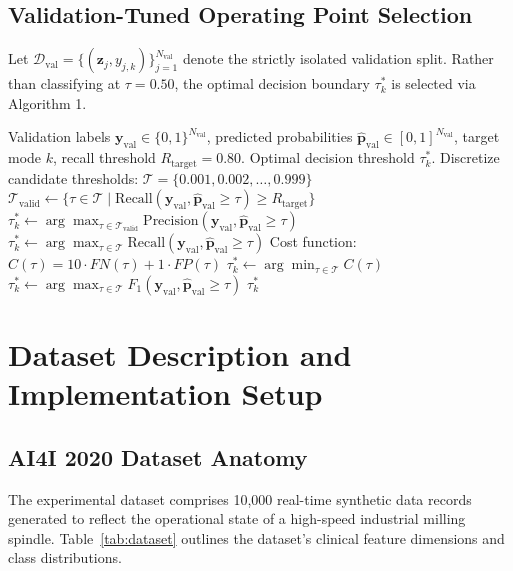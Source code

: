 \documentclass[conference]{IEEEtran}
\begin{document}
\subsection{Validation-Tuned Operating Point Selection}
Let $\mathcal{D}_{\text{val}} = \{(\mathbf{z}_j, y_{j,k})\}_{j=1}^{N_{\text{val}}}$ denote the strictly isolated validation split. Rather than classifying at $\tau = 0.50$, the optimal decision boundary $\tau_k^*$ is selected via Algorithm 1.

\begin{algorithm}[h]
\caption{Aegis Validation-Tuned Operating Point Selection}
\begin{algorithmic}[1]
\REQUIRE Validation labels $\mathbf{y}_{\text{val}} \in \{0, 1\}^{N_{\text{val}}}$, predicted probabilities $\hat{\mathbf{p}}_{\text{val}} \in [0, 1]^{N_{\text{val}}}$, target mode $k$, recall threshold $R_{\text{target}} = 0.80$.
\ENSURE Optimal decision threshold $\tau_k^*$.
\STATE Discretize candidate thresholds: $\mathcal{T} = \{0.001, 0.002, \dots, 0.999\}$
    \STATE $\mathcal{T}_{\text{valid}} \leftarrow \{\tau \in \mathcal{T} \mid \text{Recall}(\mathbf{y}_{\text{val}}, \hat{\mathbf{p}}_{\text{val}} \ge \tau) \ge R_{\text{target}}\}$
        \STATE $\tau_k^* \leftarrow \arg\max_{\tau \in \mathcal{T}_{\text{valid}}} \text{Precision}(\mathbf{y}_{\text{val}}, \hat{\mathbf{p}}_{\text{val}} \ge \tau)$
    \ELSE
        \STATE $\tau_k^* \leftarrow \arg\max_{\tau \in \mathcal{T}} \text{Recall}(\mathbf{y}_{\text{val}}, \hat{\mathbf{p}}_{\text{val}} \ge \tau)$
    \ENDIF
{}
    \STATE Cost function: $C(\tau) = 10 \cdot FN(\tau) + 1 \cdot FP(\tau)$
    \STATE $\tau_k^* \leftarrow \arg\min_{\tau \in \mathcal{T}} C(\tau)$
\ELSE
    \STATE $\tau_k^* \leftarrow \arg\max_{\tau \in \mathcal{T}} F_1(\mathbf{y}_{\text{val}}, \hat{\mathbf{p}}_{\text{val}} \ge \tau)$
\ENDIF
\RETURN $\tau_k^*$
\end{algorithmic}
\end{algorithm}

\section{Dataset Description and Implementation Setup}

\subsection{AI4I 2020 Dataset Anatomy}
The experimental dataset comprises 10,000 real-time synthetic data records generated to reflect the operational state of a high-speed industrial milling spindle. Table~\ref{tab:dataset} outlines the dataset's clinical feature dimensions and class distributions.
\end{document}
